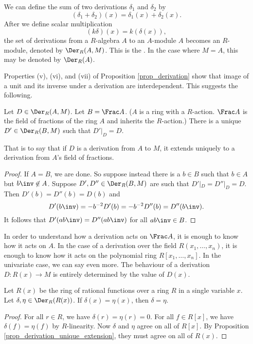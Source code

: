 We can define the sum of two derivations $\delta_1$ and $\delta_2$ by
  \[ (\delta_1 + \delta_2)(x) = \delta_1(x) + \delta_2(x). \]
After we define scalar multiplication
  \[ (k\delta)(x) = k (\delta(x)), \]
the set of derivations from a $R$-algebra $A$ to an $A$-module $A$ becomes an $R$-module,
denoted by $\Der_R(A,M)$.
This is the .
In the case where $M = A$, this may be denoted by $\Der_R(A)$.

Properties (v), (vi), and (vii) of Proposition \ref{prop_derivation}
show that image of a unit and its inverse under a derivation are interdependent.
This suggests the following.

\begin{proposition}
  \label{prop_derivation_unique_extension}
  Let $D \in \Der_R(A,M)$.
  Let $B = \Frac A$.
  ($A$ is a ring with a $R$-action.
  $\Frac A$ is the field of fractions of the ring $A$ and inherits the $R$-action.)
  There is a unique $D' \in \Der_R(B, M)$ such that $D'|_{D} = D$.
\end{proposition}
That is to say that if $D$ is a derivation from $A$ to $M$,
it extends uniquely to a derivation from $A$'s field of fractions.
\begin{proof}
  If $A = B$, we are done.
  So suppose instead there is a $b \in B$ such that $b\in A$ but $b\inv \not \in A$.
  Suppose $D', D'' \in \Der_R(B, M)$ are such that $D'|_{D} = D''|_{D} = D$.
  Then $D'(b) = D''(b) = D(b)$ and
    \[ D'(b\inv) = -b^{-2}D'(b) = -b^{-2}D''(b) = D''(b\inv). \]
  It follows that $D'(ab\inv) = D''(ab\inv)$ for all $ab\inv \in B$.
\end{proof}

In order to understand how a derivation acts on $\Frac A$, it is enough to know how it acts on $A$.
In the case of a derivation over the field $R(x_1, \ldots, x_n)$,
it is enough to know how it acts on the polynomial ring $R[x_1, \ldots, x_n]$.
In the univariate case, we can say even more.
The behaviour of a derivation $D: R(x) \to M$ is entirely determined by the value of $D(x)$.

\begin{proposition}
  \label{prop_derivation_unique_x}
  Let $R(x)$ be the ring of rational functions over a ring $R$ in a single variable $x$.
  Let $\delta, \eta \in \Der_R(R(x))$.
  If $\delta(x) = \eta(x)$, then $\delta = \eta$.
\end{proposition}
\begin{proof}
  For all $r \in R$, we have $\delta(r) = \eta(r) = 0$.
  For all $f \in R[x]$, we have $\delta(f) = \eta(f)$ by $R$-linearity.
  Now $\delta$ and $\eta$ agree on all of $R[x]$.
  By Proposition \ref{prop_derivation_unique_extension}, they must agree on all of $R(x)$.
\end{proof}

